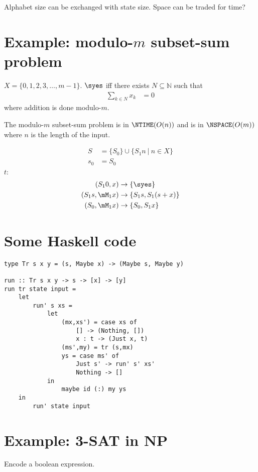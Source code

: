 Alphabet size can be exchanged with state size.
Space can be traded for time?

\section{Example: modulo-$m$ subset-sum problem}

$X = \{0,1,2,3,\ldots,m-1\}$.
$\syes$ iff there exists $N \subseteq \mathbb N$ such that
\begin{align}
    \sum_{k \in N} x_k &= 0
\end{align}
where addition is done modulo-$m$.

The modulo-$m$ subset-sum problem is in $\NTIME(O(n))$ and is in $\NSPACE(O(m))$
where $n$ is the length of the input.

\begin{align}
    S &= \{ S_0 \} \cup \{ S_1 n ~|~ n \in X \}
    \\ s_0 &= S_0
\end{align}
$t$:
\begin{align}
    (S_1 0, x) &\to \{ \syes \}
    \\ (S_1 s, \mM_1 x) &\to \{ S_1 s, S_1 (s+x) \}
    \\ (S_0, \mM_1 x) &\to \{ S_0, S_1 x \}
\end{align}

\section{Some Haskell code}

\begin{verbatim}
type Tr s x y = (s, Maybe x) -> (Maybe s, Maybe y)

run :: Tr s x y -> s -> [x] -> [y]
run tr state input =
    let
        run' s xs =
            let
                (mx,xs') = case xs of
                    [] -> (Nothing, [])
                    x : t -> (Just x, t)
                (ms',my) = tr (s,mx)
                ys = case ms' of
                    Just s' -> run' s' xs'
                    Nothing -> []
            in
                maybe id (:) my ys
    in
        run' state input
\end{verbatim}

\section{Example: 3-SAT in NP}

Encode a boolean expression.

